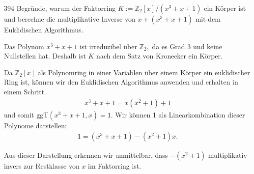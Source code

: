 \begin{algebraUE}{394}
  Begründe, warum der Faktorring $K := \mathbb{Z}_2[x]/(x^3 + x + 1)$ ein Körper ist und berechne die multiplikative Inverse von $x + (x^3 + x + 1)$ mit dem Euklidischen Algorithmus.

\end{algebraUE}

\begin{solution}
  Das Polynom $x^3 + x + 1$ ist irreduzibel über $\mathbb{Z}_2,$ da es Grad 3 und keine Nullstellen hat. Deshalb ist $K$ nach dem Satz von Kronecker ein Körper.

  Da $\mathbb{Z}_2[x]$ als Polynomring in einer Variablen über einem Körper ein euklidischer Ring ist, können wir den Euklidischen Algorithmus anwenden und erhalten in einem Schritt
  \begin{align}
  x^3 + x + 1 = x(x^2 + 1) + 1
  \end{align}
  und somit $\mathrm{ggT}(x^3 + x + 1, x) = 1.$ Wir können 1 als Linearkombination dieser Polynome darstellen:
  \begin{align}
      1 = (x^3 + x + 1) - (x^2 + 1)x.
  \end{align}

  Aus dieser Darstellung erkennen wir unmittelbar, dass $-(x^2+1)$ multiplikativ invers zur Restklasse von $x$ im Faktorring ist.
\end{solution}
